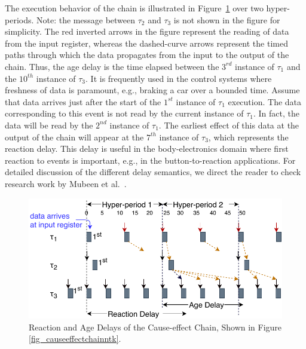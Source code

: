 The execution behavior of the chain is illustrated in Figure~\ref{fig_timedchainntk} over two hyper-periods.  Note:  the message between $\tau_2$ and $\tau_3$ is not shown in the figure for simplicity. The red inverted arrows in the figure represent the reading of data from the input register, whereas the dashed-curve arrows represent the timed paths through which the data propagates from the input to the output of the chain. Thus, the age delay is the time elapsed between the $3^{rd}$ instance of  $\tau_1$  and the $10^{th}$ instance of $\tau_3$. It is frequently used in the control systems where freshness of data is paramount, e.g., braking a car over a bounded time. Assume that data arrives just after the start of the $1^{st}$ instance of $\tau_1$ execution. The data corresponding to this event is not read by the current instance of $\tau_1$. In fact, the data will be read by the $2^{nd}$ instance of $\tau_1$. The earliest effect of this data at the output of the chain will appear at the $7^{th}$ instance of $\tau_3$, which represents the reaction delay. This delay is useful in the body-electronics domain where first reaction to events is important, e.g., in the button-to-reaction applications. For detailed discussion of the different delay semantics, we direct the reader to check research work by Mubeen et al.~\cite{mubeen2013support}. 
\begin{figure}[h]
	\centering
	\includegraphics[width=0.8\linewidth]{img/timedchain_ntk}
	\caption{Reaction and Age Delays of the Cause-effect Chain, Shown in Figure {\ref{fig_causeeffectchainntk}}.}
	\label{fig_timedchainntk}
\end{figure}

